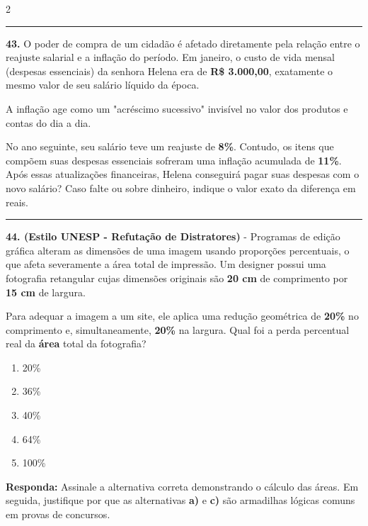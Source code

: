 \documentclass[twoside, 10pt, a4paper]{article}
\newlength{\espacoPreQuestao}
\newlength{\espacoQuestao}
\begin{document}
\begin{multicols*}{2}
\noindent\textcolor{CorLinha}{\rule{\linewidth}{0.5pt}} 
\par\vspace{\espacoPreQuestao}
\textbf{43.} O poder de compra de um cidadão é afetado diretamente pela relação entre o reajuste salarial e a inflação do período. Em janeiro, o custo de vida mensal (despesas essenciais) da senhora Helena era de \textbf{R\$ 3.000,00}, exatamente o mesmo valor de seu salário líquido da época. 
\begin{boxdica}
A inflação age como um "acréscimo sucessivo" invisível no valor dos produtos e contas do dia a dia.
\end{boxdica}
No ano seguinte, seu salário teve um reajuste de \textbf{8\%}. Contudo, os itens que compõem suas despesas essenciais sofreram uma inflação acumulada de \textbf{11\%}. Após essas atualizações financeiras, Helena conseguirá pagar suas despesas com o novo salário? Caso falte ou sobre dinheiro, indique o valor exato da diferença em reais.
\par\vspace{\espacoQuestao}

\noindent\textcolor{CorLinha}{\rule{\linewidth}{0.5pt}} 
\par\vspace{\espacoPreQuestao}
\textbf{44. (Estilo UNESP - Refutação de Distratores)} - Programas de edição gráfica alteram as dimensões de uma imagem usando proporções percentuais, o que afeta severamente a área total de impressão. Um designer possui uma fotografia retangular cujas dimensões originais são \textbf{20 cm} de comprimento por \textbf{15 cm} de largura. 

Para adequar a imagem a um site, ele aplica uma redução geométrica de \textbf{20\%} no comprimento e, simultaneamente, \textbf{20\%} na largura. Qual foi a perda percentual real da \textbf{área} total da fotografia?
\begin{enumerate}[label=\alph*)]
    \item 20\%
    \item 36\%
    \item 40\%
    \item 64\%
    \item 100\%
\end{enumerate}
\begin{boxresponda}
\textbf{Responda:} Assinale a alternativa correta demonstrando o cálculo das áreas. Em seguida, justifique por que as alternativas \textbf{a)} e \textbf{c)} são armadilhas lógicas comuns em provas de concursos.
\end{boxresponda}
\par\vspace{\espacoQuestao}


\end{multicols*}
\end{document}
